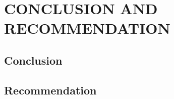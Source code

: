 
\chapter{CONCLUSION AND RECOMMENDATION} %

\label{Chapter6} %

\section{Conclusion}

\section{Recommendation}


